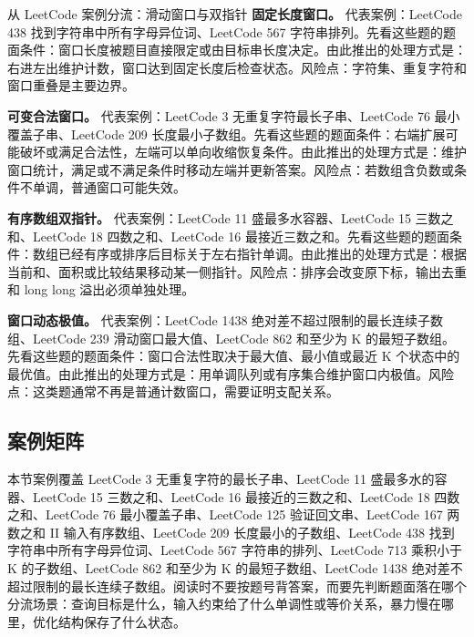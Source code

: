 \begin{principlebox}{从 LeetCode 案例分流：滑动窗口与双指针}
\textbf{固定长度窗口。}
代表案例：LeetCode 438 找到字符串中所有字母异位词、LeetCode 567 字符串排列。先看这些题的题面条件：窗口长度被题目直接限定或由目标串长度决定。由此推出的处理方式是：右进左出维护计数，窗口达到固定长度后检查状态。风险点：字符集、重复字符和窗口重叠是主要边界。

\textbf{可变合法窗口。}
代表案例：LeetCode 3 无重复字符最长子串、LeetCode 76 最小覆盖子串、LeetCode 209 长度最小子数组。先看这些题的题面条件：右端扩展可能破坏或满足合法性，左端可以单向收缩恢复条件。由此推出的处理方式是：维护窗口统计，满足或不满足条件时移动左端并更新答案。风险点：若数组含负数或条件不单调，普通窗口可能失效。

\textbf{有序数组双指针。}
代表案例：LeetCode 11 盛最多水容器、LeetCode 15 三数之和、LeetCode 18 四数之和、LeetCode 16 最接近三数之和。先看这些题的题面条件：数组已经有序或排序后目标关于左右指针单调。由此推出的处理方式是：根据当前和、面积或比较结果移动某一侧指针。风险点：排序会改变原下标，输出去重和 long long 溢出必须单独处理。

\textbf{窗口动态极值。}
代表案例：LeetCode 1438 绝对差不超过限制的最长连续子数组、LeetCode 239 滑动窗口最大值、LeetCode 862 和至少为 K 的最短子数组。先看这些题的题面条件：窗口合法性取决于最大值、最小值或最近 K 个状态中的最优值。由此推出的处理方式是：用单调队列或有序集合维护窗口内极值。风险点：这类题通常不再是普通计数窗口，需要证明支配关系。

\end{principlebox}

\subsection{案例矩阵}

本节案例覆盖 LeetCode 3 无重复字符的最长子串、LeetCode 11 盛最多水的容器、LeetCode 15 三数之和、LeetCode 16 最接近的三数之和、LeetCode 18 四数之和、LeetCode 76 最小覆盖子串、LeetCode 125 验证回文串、LeetCode 167 两数之和 II 输入有序数组、LeetCode 209 长度最小的子数组、LeetCode 438 找到字符串中所有字母异位词、LeetCode 567 字符串的排列、LeetCode 713 乘积小于 K 的子数组、LeetCode 862 和至少为 K 的最短子数组、LeetCode 1438 绝对差不超过限制的最长连续子数组。阅读时不要按题号背答案，而要先判断题面落在哪个分流场景：查询目标是什么，输入约束给了什么单调性或等价关系，暴力慢在哪里，优化结构保存了什么状态。

